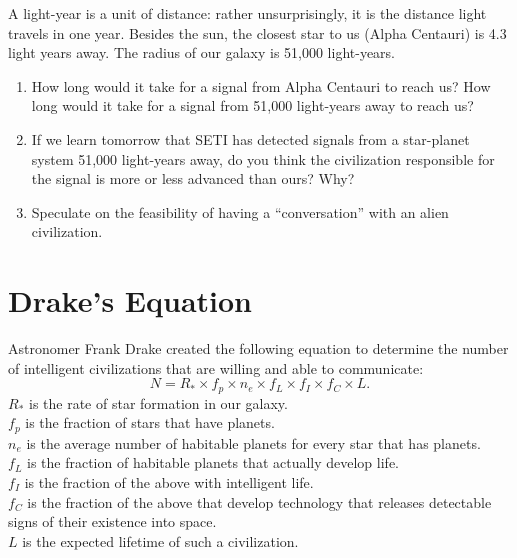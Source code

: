\documentclass[10pt]{article}%
\begin{document}
A light-year is a unit of distance: rather unsurprisingly, it is the distance light travels in one year.  
Besides the sun, the closest star to us (Alpha Centauri) is 4.3 light years away.  
The radius of our galaxy is 51,000 light-years.  

\begin{enumerate}

\item How long would it take for a signal from Alpha Centauri to reach us?  
How long would it take for a signal from 51,000 light-years away to reach us?  %

\item  If we learn tomorrow that SETI has detected signals from a star-planet system 51,000 light-years away, do you think the civilization responsible for the signal is more or less advanced than ours?  Why? %

\item Speculate on the feasibility of having a ``conversation'' with an alien civilization. 

\end{enumerate}


\section{Drake's Equation}
Astronomer Frank Drake created the following equation to determine the number of intelligent civilizations that are willing and able to communicate:
$$ N = R_{*} \times f_{p} \times n_{e} \times f_{L} \times f_{I} \times f_{C} \times L. $$
$R_{*}$ is the rate of star formation in our galaxy.
\\
$f_{p}$ is the fraction of stars that have planets.
\\
$n_{e}$ is the average number of habitable planets for every star that has planets.
\\
$f_{L}$ is the fraction of habitable planets that actually develop life.
\\
$f_{I}$ is the fraction of the above with intelligent life.
\\
$f_{C}$ is the fraction of the above that develop technology that releases detectable signs of their existence into space.
\\
$L$ is the expected lifetime of such a civilization.
\end{document}
